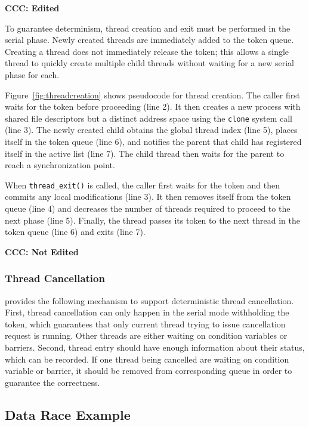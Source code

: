 \textbf{CCC: Edited}

To guarantee determinism, thread creation and exit must be performed in the serial phase.  Newly created threads are immediately added to the token queue.  Creating a thread does not immediately release the token; this allows a single thread to quickly create multiple child threads without waiting for a new serial phase for each.

Figure~\ref{fig:threadcreation} shows pseudocode for thread creation. The caller first waits for the token before proceeding (line 2).  It then creates a new process with shared file descriptors but a distinct address space using the \texttt{clone} system call (line 3).  The newly created child obtains the global thread index (line 5), places itself in the token queue (line 6), and notifies the parent that child has registered itself in the active list (line 7). The child thread then waits for the parent to reach a synchronization point.

When \texttt{thread\_exit()} is called, the caller first waits for the token and then commits any local modifications (line 3). It then removes itself from the token queue (line 4) and decreases the number of threads required to proceed to the next phase (line 5). Finally, the thread passes its token to the next thread in the token queue (line 6) and exits (line 7).

\textbf{CCC: Not Edited}

\subsubsection{Thread Cancellation}

\dthreads{} provides the following mechanism to support
deterministic thread cancellation. First, thread cancellation can only
happen in the serial mode withholding the token, which guarantees that
only current thread trying to issue cancellation request is
running. Other threads are either waiting on condition variables or
barriers. Second, thread entry should have enough information about
their status, which can be recorded. If one thread being cancelled are
waiting on condition variable or barrier, it should be removed from
corresponding queue in order to guarantee the correctness.

\subsection{Data Race Example}

